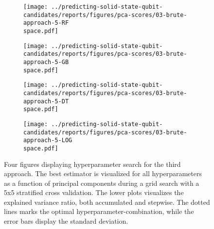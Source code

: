 \begin{figure}[!tbp]
  \begin{subfigure}[b]{0.5\textwidth}
    \texttt{[image: ../predicting-solid-state-qubit-candidates/reports/figures/pca-scores/03-brute-approach-5-RF\\space.pdf]}
    \caption{}
    \label{fig:q3-GB}
  \end{subfigure}%
  \hfill
  \begin{subfigure}[b]{0.5\textwidth}
    \texttt{[image: ../predicting-solid-state-qubit-candidates/reports/figures/pca-scores/03-brute-approach-5-GB\\space.pdf]}
    \caption{}
    \label{fig:q3-RF}
  \end{subfigure}

  \begin{subfigure}[b]{0.5\textwidth}
    \texttt{[image: ../predicting-solid-state-qubit-candidates/reports/figures/pca-scores/03-brute-approach-5-DT\\space.pdf]}
    \caption{}
    \label{fig:q3-DT}
  \end{subfigure}%
  \hfill
  \begin{subfigure}[b]{0.5\textwidth}
    \texttt{[image: ../predicting-solid-state-qubit-candidates/reports/figures/pca-scores/03-brute-approach-5-LOG\\space.pdf]}
    \caption{}
    \label{fig:q3-LOG}
  \end{subfigure}
  \vspace*{-95mm}
  \caption{{Four figures displaying hyperparameter search for the third approach. The best estimator is visualized for all hyperparameters as a function of principal components during a grid search with a 5x5 stratified cross validation. The lower plots visualizes the explained variance ratio, both accumulated and stepwise. The dotted lines marks the optimal hyperparameter-combination, while the error bars display the standard deviation. }}
\end{figure}
